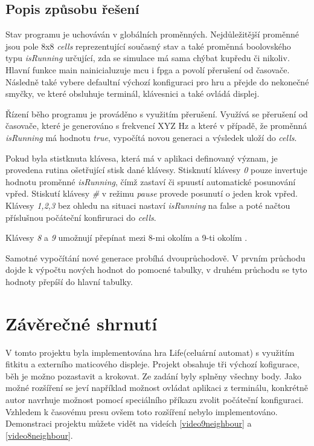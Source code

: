 \documentclass[12pt,a4paper,titlepage]{article}
\begin{document}
\subsection{Popis způsobu řešení}
Stav programu je uchováván v globálních proměnných. Nejdůležitější proměnné jsou pole 8x8 \textit{cells} reprezentující současný stav a také proměnná boolovského typu \textit{isRunning} určující, zda se simulace má sama chýbat kupředu či nikoliv. Hlavní funkce main nainicialuzuje mcu i fpga a povolí přerušení od časovače. Následně také vybere defaultní výchozí konfiguraci pro hru a přejde do nekonečné smyčky, ve které obsluhuje terminál, klávesnici a také ovládá displej.

Řízení běho programu je prováděno s využitím přerušení. Využívá se přerušení od časovače, které je generováno s frekvencí XYZ Hz a které v případě, že proměnná \textit{isRunning} má hodnotu \textit{true}, vypočítá novou generaci a výsledek uloží do \textit{cells}.


Pokud byla stistknuta klávesa, která má v aplikaci definovaný význam, je provedena rutina ošetřující stisk dané klávesy.
Stisknutí klávesy \textit{0} pouze invertuje hodnotu proměnné \textit{isRunning}, čímž zastaví či spuustí automatické posunování vpřed. Stiskutí klávesy \textit{\#} v režimu \textit{pause} provede posunutí o jeden krok vpřed. Klávesy \textit{1,2,3} bez ohledu na situaci nastaví \textit{isRunning} na false a poté načtou příslušnou počáteční konfiruraci do \textit{cells}.

Klávesy \textit{8} a \textit{9} umožnují přepínat mezi 8-mi okolím a 9-ti okolím .

Samotné vypočítání nové generace probíhá dvouprůchodově. V prvním průchodu dojde k výpočtu nových hodnot do pomocné tabulky, v druhém průchodu se tyto hodnoty přepíší do hlavní tabulky.

\section{Závěrečné shrnutí}
V tomto projektu byla implementována hra Life(celuární automat) s využitím fitkitu a externího maticového displeje. Projekt obsahuje tři výchozí kofigurace, běh je možno pozastavit a krokovat. Ze zadání byly splněny všechny body. Jako možné rozšíření se jeví například možnost ovládat aplikaci z terminálu, konkrétně autor navrhuje možnost pomocí speciálního příkazu zvolit počáteční konfiguraci. Vzhledem k časovému presu ovšem toto rozšíření nebylo implementováno. Demonstraci projektu můžete vidět na videích \ref{video9neighbour} a \ref{video8neighbour}.
\end{document}
